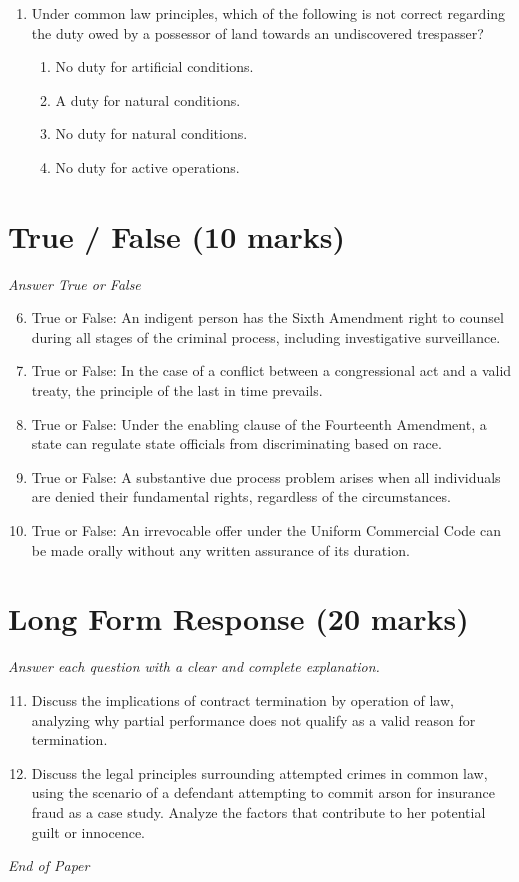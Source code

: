 \documentclass[12pt]{article}
\begin{document}
\begin{enumerate}[label=\arabic*.]
\begin{enumerate}[label=(\alph*)]
    \item Privacy
    \item Alienage
\end{enumerate}
\item Under common law principles, which of the following is not correct regarding the duty owed by a possessor of land towards an undiscovered trespasser?
\begin{enumerate}[label=(\alph*)]
    \item No duty for artificial conditions.
    \item A duty for natural conditions.
    \item No duty for natural conditions.
    \item No duty for active operations.
\end{enumerate}
\end{enumerate}

\section*{True / False (10 marks)}
\textit{Answer True or False}
\begin{enumerate}[label=\arabic*.]
\setcounter{enumi}{5}
\item True or False: An indigent person has the Sixth Amendment right to counsel during all stages of the criminal process, including investigative surveillance.
\item True or False: In the case of a conflict between a congressional act and a valid treaty, the principle of the last in time prevails.
\item True or False: Under the enabling clause of the Fourteenth Amendment, a state can regulate state officials from discriminating based on race.
\item True or False: A substantive due process problem arises when all individuals are denied their fundamental rights, regardless of the circumstances.
\item True or False: An irrevocable offer under the Uniform Commercial Code can be made orally without any written assurance of its duration.
\end{enumerate}

\section*{Long Form Response (20 marks)}
\textit{Answer each question with a clear and complete explanation.}
\begin{enumerate}[label=\arabic*.]
\setcounter{enumi}{10}
\item Discuss the implications of contract termination by operation of law, analyzing why partial performance does not qualify as a valid reason for termination.
\item Discuss the legal principles surrounding attempted crimes in common law, using the scenario of a defendant attempting to commit arson for insurance fraud as a case study. Analyze the factors that contribute to her potential guilt or innocence.
\end{enumerate}

\vfill
\noindent\textit{End of Paper}
\end{document}
